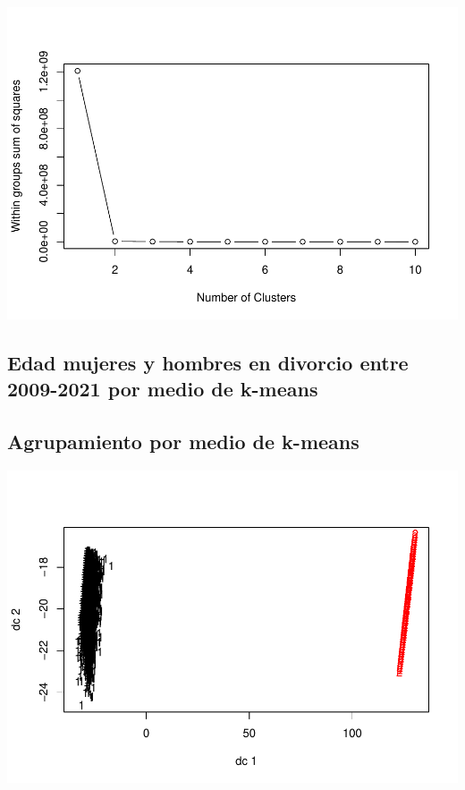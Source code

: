 \documentclass[
]{article}
\begin{document}
\includegraphics{Proyecto_files/figure-latex/cantClusters-1.pdf}

\hypertarget{edad-mujeres-y-hombres-en-divorcio-entre-2009-2021-por-medio-de-k-means}{%
\subsection{Edad mujeres y hombres en divorcio entre 2009-2021 por medio
de
k-means}\label{edad-mujeres-y-hombres-en-divorcio-entre-2009-2021-por-medio-de-k-means}}

\hypertarget{agrupamiento-por-medio-de-k-means}{%
\subsection{Agrupamiento por medio de
k-means}\label{agrupamiento-por-medio-de-k-means}}

\includegraphics{Proyecto_files/figure-latex/kmeans2-1.pdf}
\end{document}
